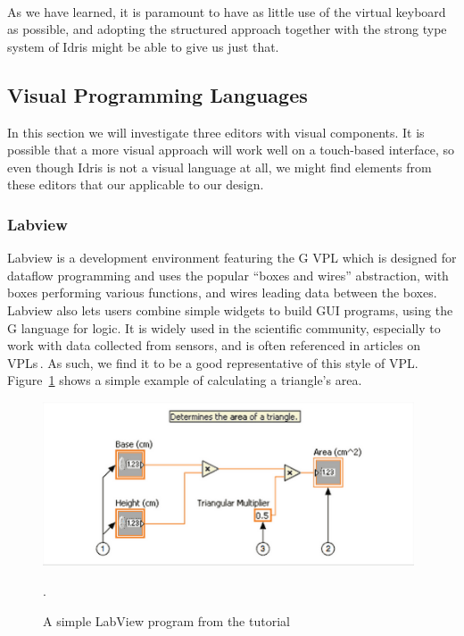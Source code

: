 \paragraph{}

As we have learned, it is paramount to have as little use of the virtual keyboard as possible, and adopting the structured approach together with the strong type system of Idris might be able to give us just that.

\subsection{Visual Programming Languages} %
\label{sub:visual_programming_languages}
In this section we will investigate three editors with visual components.
It is possible that a more visual approach will work well on a touch-based interface, so even though Idris is not a visual language at all, we might find elements from these editors that our applicable to our design.

\subsubsection{Labview}
\label{subsub:Labview}
Labview is a development environment featuring the G VPL which is designed for dataflow programming and uses the popular ``boxes and wires'' abstraction, with boxes performing various functions, and wires leading data between the boxes.
Labview also lets users combine simple widgets to build GUI programs, using the G language for logic.
It is widely used in the scientific community, especially to work with data collected from sensors, and is often referenced in articles on VPLs\,\cite{Green96usabilityanalysis,DBLP:journals/ijmms/PetreB99}.
As such, we find it to be a good representative of this style of VPL\@.
Figure~\ref{fig:LabViewGettingStarted} shows a simple example of calculating a
triangle's area.

\begin{figure}[h]
\centering
\includegraphics[width=110mm]{diagrams/LabView_screenshot.png}
\caption{A simple LabView program from the tutorial\,\cite{LabView:GettingStarted}}.
\label{fig:LabViewGettingStarted}
\end{figure}

